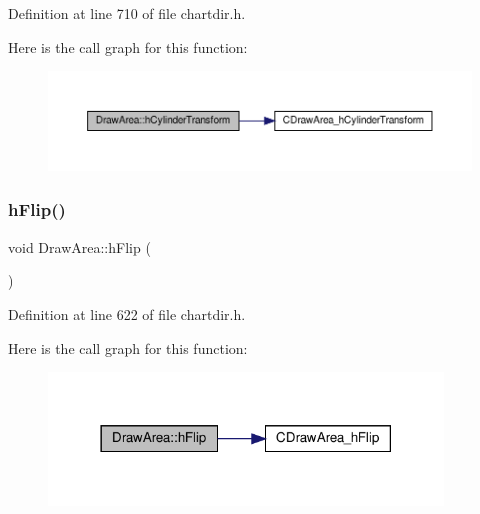 Definition at line 710 of file chartdir.\+h.

Here is the call graph for this function\+:
\nopagebreak
\begin{figure}[H]
\begin{center}
\leavevmode
\includegraphics[width=350pt]{class_draw_area_aea6c02fec02392ac6d9dc1f3d663c7e3_cgraph}
\end{center}
\end{figure}
\mbox{\label{class_draw_area_a8f6bc42ffcdc59c4b5ab81ff8a466763}} 
\subsubsection{\texorpdfstring{h\+Flip()}{hFlip()}}
{\footnotesize\ttfamily void Draw\+Area\+::h\+Flip (\begin{DoxyParamCaption}{ }\end{DoxyParamCaption})\hspace{0.3cm}{\ttfamily [inline]}}



Definition at line 622 of file chartdir.\+h.

Here is the call graph for this function\+:
\nopagebreak
\begin{figure}[H]
\begin{center}
\leavevmode
\includegraphics[width=297pt]{class_draw_area_a8f6bc42ffcdc59c4b5ab81ff8a466763_cgraph}
\end{center}
\end{figure}
\mbox{\label{class_draw_area_a77f8b8d3591e48dabfa4adca9e534d57}} 
